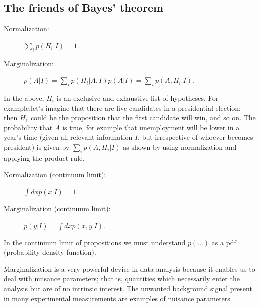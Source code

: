 \documentclass[%
oneside,                 %
final,                   %
10pt]{article}
\newenvironment{block_mdfboxadmon}[1][]{
\begin{block_mdfboxmdframed}[frametitle=#1]
}
{
\end{block_mdfboxmdframed}
}
\begin{document}
\subsection{The friends of Bayes' theorem}

\begin{block_mdfboxadmon}[]
\begin{description}
\item[Normalization:] 
  $\sum_i p(H_i|I) = 1$.

\item[Marginalization:] 
  $p(A|I) = \sum_i p(H_i|A,I) p(A|I) = \sum_i p(A,H_i|I)$.
\end{description}

\noindent
In the above, $H_i$ is an exclusive and exhaustive list of hypotheses. For example,let’s imagine that there are five candidates in a presidential election; then $H_1$ could be the proposition that the first candidate will win, and so on. The probability that $A$ is true, for example that unemployment will be lower in a year’s time (given all relevant information $I$, but irrespective of whoever becomes president) is given by $\sum_i p(A,H_i|I)$ as shown by using normalization and applying the product rule.
\end{block_mdfboxadmon} %




\begin{block_mdfboxadmon}[]
\begin{description}
\item[Normalization (continuum limit):] 
  $\int dx p(x|I) = 1$.

\item[Marginalization (continuum limit):] 
  $p(y|I) = \int dx p(x,y|I)$.
\end{description}

\noindent
In the continuum limit of propositions we must understand $p(\ldots)$ as a pdf (probability density function).

Marginalization is a very powerful device in data analysis because it enables us to deal with nuisance parameters; that is, quantities which necessarily enter the analysis but are of no intrinsic interest. The unwanted background signal present in many experimental measurements are examples of nuisance parameters.
\end{block_mdfboxadmon} %



\end{document}
